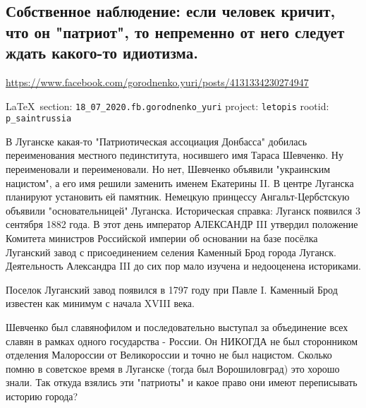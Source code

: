  
 
  
\subsection{Собственное наблюдение: если человек кричит, что он "патриот", то непременно от него следует ждать какого-то идиотизма.}
\url{https://www.facebook.com/gorodnenko.yuri/posts/4131334230274947}

\vspace{0.5cm}
{\small\LaTeX~section: \verb|18_07_2020.fb.gorodnenko_yuri| project: \verb|letopis| rootid: \verb|p_saintrussia|}
\vspace{0.5cm}

В Луганске какая-то "Патриотическая ассоциация Донбасса" добилась
переименования местного пединститута, носившего имя Тараса Шевченко. Ну
переименовали и переименовали. Но нет, Шевченко объявили "украинским нацистом",
а его имя решили заменить именем Екатерины II. В центре Луганска планируют
установить ей памятник. Немецкую принцессу Ангальт-Цербстскую объявили
"основательницей" Луганска.  Историческая справка: Луганск появился 3 сентября
1882 года. В этот день император АЛЕКСАНДР III утвердил положение Комитета
министров Российской империи об основании на базе посёлка Луганский завод с
присоединением селения Каменный Брод города Луганск. Деятельность Александра
III до сих пор мало изучена и недооценена историками.

Поселок Луганский завод появился в 1797 году при Павле I. Каменный Брод
известен как минимум с начала XVIII века.

Шевченко был славянофилом и последовательно выступал за объединение всех славян
в рамках одного государства - России. Он НИКОГДА не был сторонником отделения
Малороссии от Великороссии и точно не был нацистом.  Сколько помню в советское
время в Луганске (тогда был Ворошиловград) это хорошо знали. Так откуда взялись
эти "патриоты" и какое право они имеют переписывать историю города?
  
